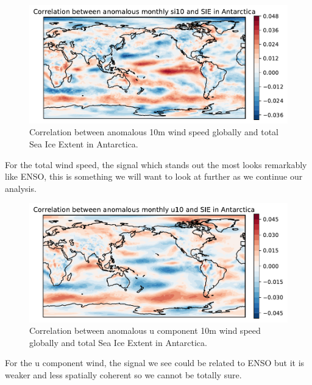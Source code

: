 \begin{figure}[H]
    \centering
    \includegraphics[width=\textwidth]{Images/global_correlation_anomalous_monthly_si10_sie.pdf}
    \caption{Correlation between anomalous 10m wind speed globally and total Sea Ice Extent in Antarctica.}
    \label{fig:si10_anomalous_sie_corr}
\end{figure}

For the total wind speed, the signal which stands out the most looks remarkably like ENSO, this is something we will want to look at further as we continue our analysis.

\begin{figure}[H]
    \centering
    \includegraphics[width=\textwidth]{Images/global_correlation_anomalous_monthly_u10_sie.pdf}
    \caption{Correlation between anomalous u component 10m wind speed globally and total Sea Ice Extent in Antarctica.}
    \label{fig:u10_anomalous_sie_corr}
\end{figure}

For the u component wind, the signal we see could be related to ENSO but it is weaker and less spatially coherent so we cannot be totally sure.

